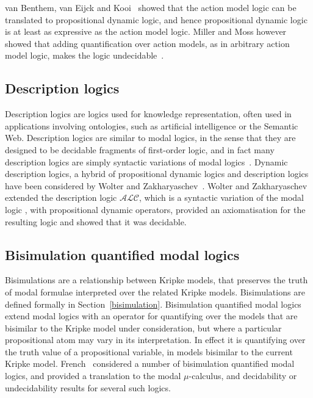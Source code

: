 van Benthem, van Eijck and Kooi~\cite{vanbenthem2006logics} showed that the
action model logic can be translated to propositional dynamic logic, and hence
propositional dynamic logic is at least as expressive as the action model logic.
Miller and Moss however showed that adding quantification over action models, as
in arbitrary action model logic, makes the logic
undecidable~\cite{miller2005undecidability}.

\subsection{Description logics}

Description logics are logics used for knowledge representation, often used in
applications involving ontologies, such as artificial intelligence or the
Semantic Web. Description logics are similar to modal logics, in the sense that
they are designed to be decidable fragments of first-order logic, and in fact
many description logics are simply syntactic variations of modal
logics~\cite{blackburn2002modal}. Dynamic description logics, a hybrid of
propositional dynamic logics and description logics have been considered by
Wolter and Zakharyaschev~\cite{wolter1998dynamic}. Wolter and Zakharyaschev
extended the description logic $\mathcal{ALC}$, which is a syntactic variation of
the modal logic \logicK{}, with propositional dynamic operators, provided an
axiomatisation for the resulting logic and showed that it was decidable.

\subsection{Bisimulation quantified modal logics}

Bisimulations are a relationship between Kripke models, that preserves the truth
of modal formulae interpreted over the related Kripke models. Bisimulations are
defined formally in Section~\ref{bisimulation}. Bisimulation quantified modal
logics extend modal logics with an operator for quantifying over the models that
are bisimilar to the Kripke model under consideration, but where a particular
propositional atom may vary in its interpretation. In effect it is quantifying
over the truth value of a propositional variable, in models bisimilar to the
current Kripke model.  French~\cite{french2006bisimulation} considered a number
of bisimulation quantified modal logics, and provided a translation to the modal
$\mu$-calculus, and decidability or undecidability results for several such
logics.

